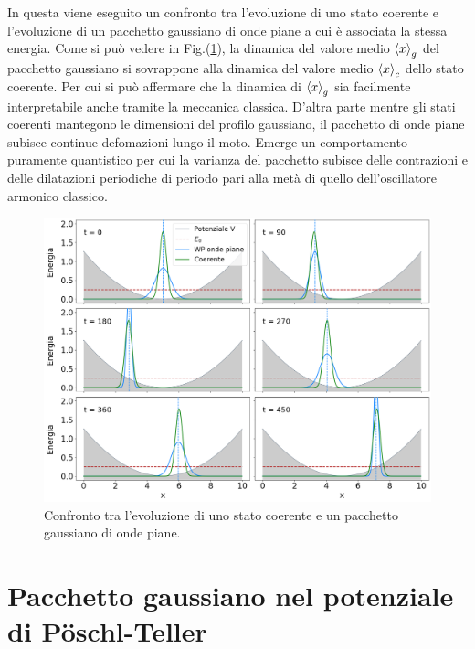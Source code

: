 \documentclass[12pt]{report}
\begin{document}
In questa viene eseguito un confronto tra l'evoluzione di uno stato coerente e l'evoluzione di un pacchetto gaussiano di onde piane a cui è associata la stessa energia.
Come si può vedere in Fig.(\ref{fig:co_vs_WP}), la dinamica del valore medio $\expval{x}_g$ del pacchetto gaussiano si %
sovrappone alla dinamica del valore medio $\expval{x}_c$ dello stato coerente. Per cui si può affermare che la dinamica di $\expval{x}_g$ sia facilmente interpretabile anche tramite la meccanica classica. D'altra parte mentre gli stati coerenti mantegono le dimensioni del profilo gaussiano, il pacchetto di onde piane subisce continue defomazioni lungo il moto. Emerge un comportamento puramente quantistico per cui la varianza del pacchetto subisce delle contrazioni e delle dilatazioni periodiche di periodo pari alla metà di quello dell'oscillatore armonico classico\cite{Tsuru:gaus_harmonic}.    

\begin{figure}
    \centering
    \includegraphics[width = \textwidth]{immagini/coherent_vs_WP.png}
    \caption{ \textcolor{dark-gray}{Confronto tra l'evoluzione di uno stato coerente e un pacchetto gaussiano di onde piane.}}
    \label{fig:co_vs_WP}
\end{figure}

\section{Pacchetto gaussiano nel potenziale di P\"oschl-Teller}
\label{sec:Wp_PT}
\end{document}
